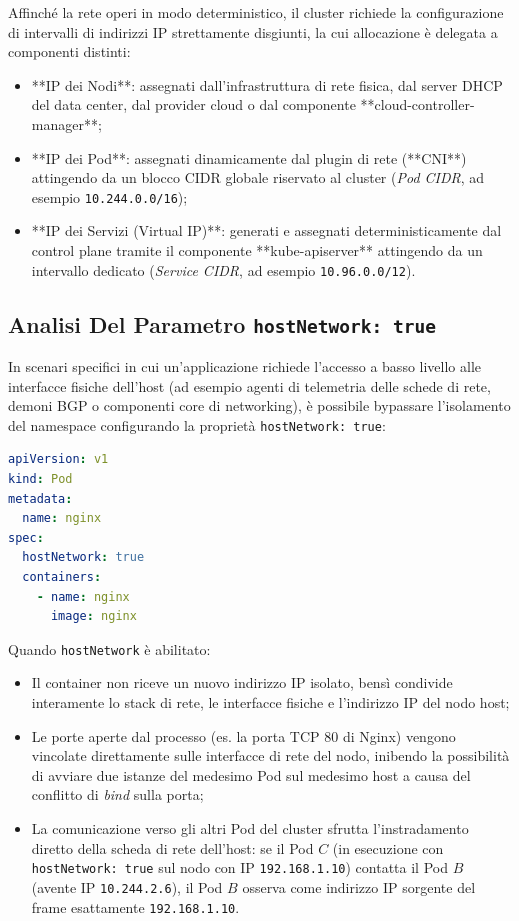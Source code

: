 \documentclass[11pt, a4paper]{article}
\begin{document}
Affinché la rete operi in modo deterministico, il cluster richiede la configurazione di intervalli di indirizzi IP strettamente disgiunti, la cui allocazione è delegata a componenti distinti:
\begin{itemize}[noitemsep]
    \item **IP dei Nodi**: assegnati dall'infrastruttura di rete fisica, dal server DHCP del data center, dal provider cloud o dal componente **cloud-controller-manager**;
    \item **IP dei Pod**: assegnati dinamicamente dal plugin di rete (**CNI**) attingendo da un blocco CIDR globale riservato al cluster (\emph{Pod CIDR}, ad esempio \texttt{10.244.0.0/16});
    \item **IP dei Servizi (Virtual IP)**: generati e assegnati deterministicamente dal control plane tramite il componente **kube-apiserver** attingendo da un intervallo dedicato (\emph{Service CIDR}, ad esempio \texttt{10.96.0.0/12}).
\end{itemize}

\subsection{Analisi Del Parametro \texttt{hostNetwork: true}}

In scenari specifici in cui un'applicazione richiede l'accesso a basso livello alle interfacce fisiche dell'host (ad esempio agenti di telemetria delle schede di rete, demoni BGP o componenti core di networking), è possibile bypassare l'isolamento del namespace configurando la proprietà \texttt{hostNetwork: true}:

\begin{lstlisting}[language=yaml]
apiVersion: v1
kind: Pod
metadata:
  name: nginx
spec:
  hostNetwork: true
  containers:
    - name: nginx
      image: nginx
\end{lstlisting}

Quando \texttt{hostNetwork} è abilitato:
\begin{itemize}[noitemsep]
    \item Il container non riceve un nuovo indirizzo IP isolato, bensì condivide interamente lo stack di rete, le interfacce fisiche e l'indirizzo IP del nodo host;
    \item Le porte aperte dal processo (es. la porta TCP 80 di Nginx) vengono vincolate direttamente sulle interfacce di rete del nodo, inibendo la possibilità di avviare due istanze del medesimo Pod sul medesimo host a causa del conflitto di \emph{bind} sulla porta;
    \item La comunicazione verso gli altri Pod del cluster sfrutta l'instradamento diretto della scheda di rete dell'host: se il Pod $C$ (in esecuzione con \texttt{hostNetwork: true} sul nodo con IP \texttt{192.168.1.10}) contatta il Pod $B$ (avente IP \texttt{10.244.2.6}), il Pod $B$ osserva come indirizzo IP sorgente del frame esattamente \texttt{192.168.1.10}.
\end{itemize}
\end{document}

